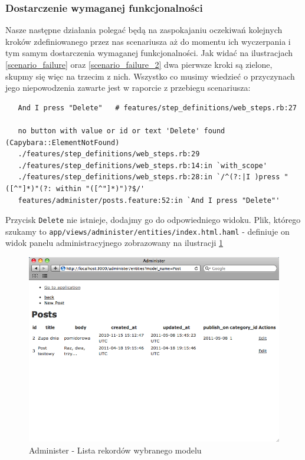    \subsubsection{Dostarczenie wymaganej funkcjonalności}
   
   Nasze następne działania polegać będą na zaspokajaniu oczekiwań kolejnych kroków zdefiniowanego przez nas scenariusza aż do momentu ich wyczerpania i tym samym dostarczenia wymaganej funkcjonalności. Jak widać na ilustracjach \ref{scenario_failure} oraz \ref{scenario_failure_2} dwa pierwsze kroki są zielone, skupmy się więc na trzecim z nich. Wszystko co musimy wiedzieć o przyczynach jego niepowodzenia zawarte jest w raporcie z przebiegu scenariusza:
   
   \begin{lstlisting}
   And I press "Delete"   # features/step_definitions/web_steps.rb:27
   
   no button with value or id or text 'Delete' found (Capybara::ElementNotFound)
   ./features/step_definitions/web_steps.rb:29
   ./features/step_definitions/web_steps.rb:14:in `with_scope'
   ./features/step_definitions/web_steps.rb:28:in `/^(?:|I )press "([^"]*)"(?: within "([^"]*)")?$/'
   features/administer/posts.feature:52:in `And I press "Delete"'
   \end{lstlisting}
   
   Przycisk \texttt{Delete} nie istnieje, dodajmy go do odpowiedniego widoku. Plik, którego szukamy to \texttt{app/views/administer/entities/index.html.haml} - definiuje on widok panelu administracyjnego zobrazowany na ilustracji \ref{administer_index}
   
   \clearpage
   
    \begin{figure}[!h]
  		\begin{center}
  			\includegraphics[width=\linewidth]{images/administer_index.png}
  			\caption{Administer - Lista rekordów wybranego modelu}
  			\label{administer_index}
  		\end{center}
  	\end{figure}
  	

